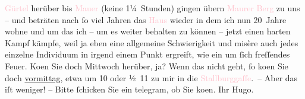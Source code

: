                   \textcolor{pink}{Gürtel}{}\ledrightnote{\textcolor{pink}{Gürtel}} herüber bis \textcolor{pink}{Mauer}{}\ledrightnote{\textcolor{pink}{Mauer}} (keine 1¼ Stunden) gingen übern \textcolor{pink}{Maurer
                  Berg}{}\ledrightnote{\textcolor{pink}{Maurer Berg}} zu uns – und beträten nach ſo viel Jahren das \textcolor{pink}{Haus}{} wieder in dem ich nun 20 Jahre wohne und
               um das ich – um es weiter behalten zu können – jetzt einen harten Kampf kämpfe, weil
               ja eben eine {\pb}allgemeine
               Schwierigkeit und misère auch jedes einzelne Individuum in irgend einem Punkt
               ergreift, wie ein um ſich freſſendes Feuer.\pend
           \pstart
           Ko{\geminationm}en Sie doch Mittwoch herüber, ja?\pend
           \pstart
           Wenn das nicht geht, ſo ko{\geminationm}en Sie doch \label{K_L02364_1v}\label{K_L02364_1h}{ }\uline{vormittag}, etwa um 10 oder ½ 11 zu mir in die \textcolor{pink}{Stallburggaſſe}{}\ledrightnote{\textcolor{pink}{Stallburggasse}}. – Aber das iſt weniger! – Bitte
               ſchicken Sie ein telegram, ob Sie ko{\geminationm}en.\pend
           \pstart Ihr \spacefill\mbox{Hugo.}\pend{}\endnumbering{}  
      
